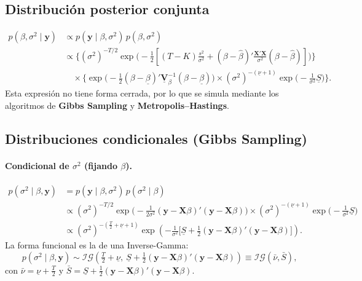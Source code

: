 \documentclass[11pt]{article}
\newcommand{\IG}{\mathcal{IG}}
\newcommand{\bX}{\mathbf{X}}
\newcommand{\by}{\mathbf{y}}
\newcommand{\bV}{\mathbf{V}}
\theoremstyle{definition}
\begin{document}
\subsection{Distribución posterior conjunta}
\begin{align*}
p(\beta,\sigma^2\mid\by)&\propto p(\by\mid\beta,\sigma^2)\,p(\beta,\sigma^2)\\
&\propto\Big\{(\sigma^2)^{-T/2}\exp\!\big(-\tfrac12[(T-K)\tfrac{s^2}{\sigma^2}+(\beta-\hat\beta)'\tfrac{\bX'\bX}{\sigma^2}(\beta-\hat\beta)]\big)\Big\}\\
&\quad\times\Big\{\exp\!\big(-\tfrac12(\beta-\underline{\beta})'\underline{\bV}_\beta^{-1}(\beta-\underline{\beta})\big)\times(\sigma^2)^{-(\underline{\nu}+1)}\exp\!\big(-\tfrac{1}{\sigma^2}\underline{S}\big)\Big\}.
\end{align*}
Esta expresión no tiene forma cerrada, por lo que se simula mediante los algoritmos de \textbf{Gibbs Sampling} y \textbf{Metropolis--Hastings}.

\subsection{Distribuciones condicionales (Gibbs Sampling)}

\paragraph{Condicional de $\sigma^2$ (fijando $\beta$).}
\begin{align*}
p(\sigma^2\mid\beta,\by)&=p(\by\mid\beta,\sigma^2)\,p(\sigma^2\mid\beta)\\
&\propto(\sigma^2)^{-T/2}\exp\!\big(-\tfrac{1}{2\sigma^2}(\by-\bX\beta)'(\by-\bX\beta)\big)\times(\sigma^2)^{-(\underline{\nu}+1)}\exp\!\big(-\tfrac{1}{\sigma^2}\underline{S}\big)\\
&\propto(\sigma^2)^{-(\frac{T}{2}+\underline{\nu}+1)}\exp\!\left(-\tfrac{1}{\sigma^2}\Big[\underline{S}+\tfrac12(\by-\bX\beta)'(\by-\bX\beta)\Big]\right).
\end{align*}
La forma funcional es la de una Inverse-Gamma:
\[
p(\sigma^2\mid\beta,\by)\sim\IG\!\left(\tfrac{T}{2}+\underline{\nu},\ \underline{S}+\tfrac12(\by-\bX\beta)'(\by-\bX\beta)\right)\equiv\IG(\bar\nu,\bar S),
\]
con $\bar\nu=\underline{\nu}+\tfrac{T}{2}$ y $\bar S=\underline{S}+\tfrac12(\by-\bX\beta)'(\by-\bX\beta)$.
\end{document}
